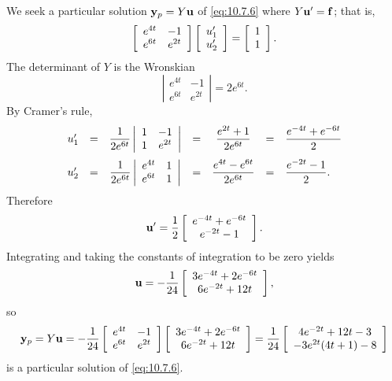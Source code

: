 \begin{examplesolution}
\solution We seek a particular solution ${\bf y}_{p}=Y{\bf u}$ of \eqref{eq:10.7.6} where
$Y{\bf u}'={\bf f}$; that is,
\[
  \left[
  \begin{array}{cc}
    e^{4t} & -1     \\
    e^{6t} & e^{2t}
  \end{array}\right] \left[\begin{array}{l}u_{1}'\\u_{2}'\end{array}\right]=\left[\begin{array}{l}1\\1\end{array}\right].
\]
The determinant of $Y$ is the Wronskian
\[
  \left|
  \begin{array}{cc}
    e^{4t} & -1     \\
    e^{6t} & e^{2t}
  \end{array}\right|=2e^{6t}.
\]
By Cramer's rule,
\[
  \begin{array}{cccccll}
    u_{1}' & = & \displaystyle\frac{1}{2e^{6t}}\left|\begin{array}{cc}1&-1\\1&e^{2t}\end{array}\right|     & = & \displaystyle\frac{e^{2t}+1}{2e^{6t}}      & = & \displaystyle\frac{e^{-4t}+e^{-6t}}{2} \\[4\jot]
    u_{2}' & = & \displaystyle\frac{1}{2e^{6t}}\left|\begin{array}{cc}e^{4t}&1\\e^{6t}&1\end{array}\right| & = & \displaystyle\frac{e^{4t}-e^{6t}}{2e^{6t}} & = & \displaystyle\frac{e^{-2t}-1}{2}.
  \end{array}
\]
Therefore
\[
  {\bf u}'=\frac{1}{2}\left[
  \begin{array}{c}
    e^{-4t}+e^{-6t} \\
    e^{-2t}-1
  \end{array}\right].
\]
Integrating and taking the constants of integration to be zero yields
\[
  {\bf u}=-\frac{1}{24}\left[
  \begin{array}{c}
    3e^{-4t}+2e^{-6t} \\
    6e^{-2t}+12t
  \end{array}\right],
\]
so
\[
  {\bf y}_{p}=Y{\bf u}= -\displaystyle\frac{1}{24}\left[
  \begin{array}{cc}
    e^{4t} & -1     \\
    e^{6t} & e^{2t}
  \end{array}\right] \left[
  \begin{array}{c}
    3e^{-4t}+2e^{-6t} \\
    6e^{-2t}+12t
  \end{array}\right] =\displaystyle\frac{1}{24}\left[
  \begin{array}{c}
    4e^{-2t}+12t-3   \\
    -3e^{2t}(4t+1)-8
  \end{array}\right]
\]
is a particular solution of \eqref{eq:10.7.6}.
\end{examplesolution}

